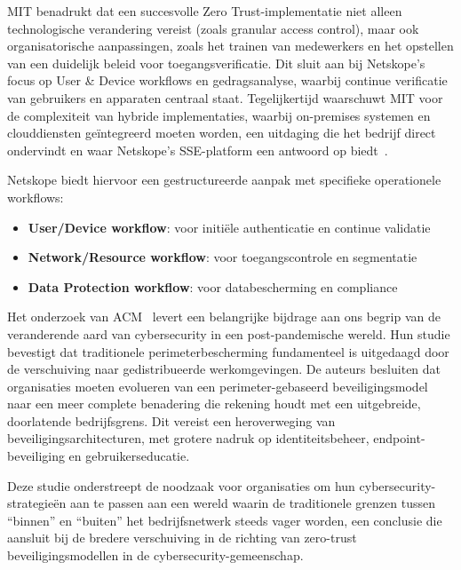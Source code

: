 \vspace{2ex}

MIT benadrukt dat een succesvolle Zero Trust-implementatie niet alleen technologische verandering vereist (zoals granular access control), maar ook organisatorische aanpassingen, zoals het trainen van medewerkers en het opstellen van een duidelijk beleid voor toegangsverificatie. 
Dit sluit aan bij Netskope’s focus op User \& Device workflows en gedragsanalyse, waarbij continue verificatie van gebruikers en apparaten centraal staat. 
Tegelijkertijd waarschuwt MIT voor de complexiteit van hybride implementaties, waarbij on-premises systemen en clouddiensten geïntegreerd moeten worden, een uitdaging die het bedrijf direct ondervindt en waar Netskope’s SSE-platform een antwoord op biedt~\autocite{MIT2022}.

\vspace{2ex}

Netskope biedt hiervoor een gestructureerde aanpak met specifieke operationele workflows:
\begin{itemize}
  \item \textbf{User/Device workflow}: voor initiële authenticatie en continue validatie
  \item \textbf{Network/Resource workflow}: voor toegangscontrole en segmentatie
  \item \textbf{Data Protection workflow}: voor databescherming en compliance
\end{itemize}

\vspace{2ex}

Het onderzoek van ACM~\autocite{ACM2021} levert een belangrijke bijdrage aan ons begrip van de veranderende aard van cybersecurity in een post-pandemische wereld. Hun studie bevestigt dat traditionele perimeterbescherming fundamenteel is uitgedaagd door de verschuiving naar gedistribueerde werkomgevingen.
De auteurs besluiten dat organisaties moeten evolueren van een perimeter-gebaseerd beveiligingsmodel naar een meer complete benadering die rekening houdt met een uitgebreide, doorlatende bedrijfsgrens. Dit vereist een heroverweging van beveiligingsarchitecturen, met grotere nadruk op identiteitsbeheer, endpoint-beveiliging en gebruikerseducatie.

\vspace{2ex}

Deze studie onderstreept de noodzaak voor organisaties om hun cybersecurity-strategieën aan te passen aan een wereld waarin de traditionele grenzen tussen “binnen” en “buiten” het bedrijfsnetwerk steeds vager worden, een conclusie die aansluit bij de bredere verschuiving in de richting van zero-trust beveiligingsmodellen in de cybersecurity-gemeenschap.

